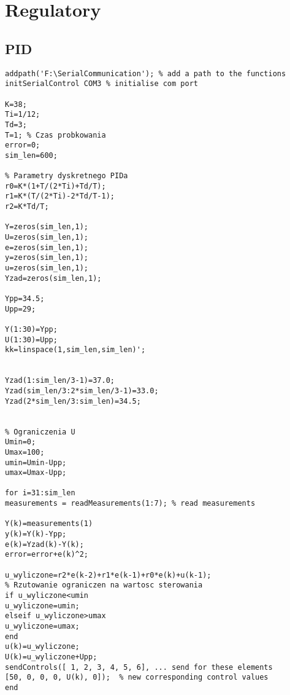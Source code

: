 \chapter{Regulatory}
\section{PID}
\begin{lstlisting}[style=Matlab-editor]
addpath('F:\SerialCommunication'); % add a path to the functions
initSerialControl COM3 % initialise com port

K=38;
Ti=1/12;
Td=3;
T=1; % Czas probkowania
error=0;
sim_len=600;

% Parametry dyskretnego PIDa
r0=K*(1+T/(2*Ti)+Td/T);
r1=K*(T/(2*Ti)-2*Td/T-1);
r2=K*Td/T;

Y=zeros(sim_len,1);
U=zeros(sim_len,1);
e=zeros(sim_len,1);
y=zeros(sim_len,1);
u=zeros(sim_len,1);
Yzad=zeros(sim_len,1);

Ypp=34.5;
Upp=29;

Y(1:30)=Ypp;
U(1:30)=Upp;
kk=linspace(1,sim_len,sim_len)';


Yzad(1:sim_len/3-1)=37.0;
Yzad(sim_len/3:2*sim_len/3-1)=33.0;
Yzad(2*sim_len/3:sim_len)=34.5;


% Ograniczenia U
Umin=0;
Umax=100;
umin=Umin-Upp;
umax=Umax-Upp;

for i=31:sim_len
measurements = readMeasurements(1:7); % read measurements

Y(k)=measurements(1)
y(k)=Y(k)-Ypp;
e(k)=Yzad(k)-Y(k);
error=error+e(k)^2;

u_wyliczone=r2*e(k-2)+r1*e(k-1)+r0*e(k)+u(k-1);
% Rzutowanie ograniczen na wartosc sterowania
if u_wyliczone<umin
u_wyliczone=umin;
elseif u_wyliczone>umax
u_wyliczone=umax;
end
u(k)=u_wyliczone;
U(k)=u_wyliczone+Upp;
sendControls([ 1, 2, 3, 4, 5, 6], ... send for these elements
[50, 0, 0, 0, U(k), 0]);  % new corresponding control values
end
\end{lstlisting} 
